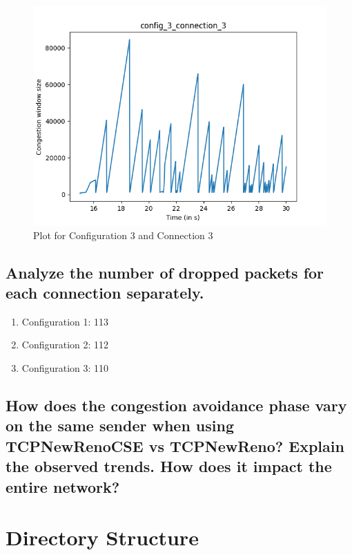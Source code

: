 \documentclass{article}
\begin{document}
\begin{figure}[H]
    \centering
    \includegraphics[scale = 0.8]{Q3/outputs/plots/config_3_connection_3.png}
    \caption{Plot for Configuration 3 and Connection 3}
\end{figure}

\subsection{Analyze the number of dropped packets for each connection separately.}

\begin{enumerate}
    \item Configuration 1: 113
    \item Configuration 2: 112
    \item Configuration 3: 110
\end{enumerate}



\subsection{How does the congestion avoidance phase vary on the same sender when using
TCPNewRenoCSE vs TCPNewReno? Explain the observed trends. How does it
impact the entire network?}



\section{Directory Structure}
\end{document}
